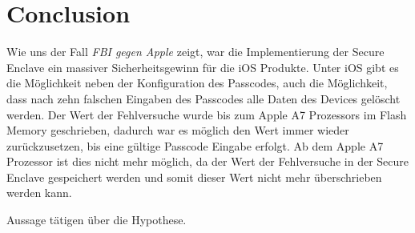 %
%
%
% 


\chapter{Conclusion}
\label{ch:Conclusion}

Wie uns der Fall \textit{\glqq FBI gegen Apple\grqq{}} zeigt, war die Implementierung der Secure Enclave ein massiver Sicherheitsgewinn für die iOS Produkte. Unter iOS gibt es die Möglichkeit neben der Konfiguration des Passcodes, auch die Möglichkeit, dass nach zehn falschen Eingaben des Passcodes alle Daten des Devices gelöscht werden. Der Wert der Fehlversuche wurde bis zum Apple A7 Prozessors im Flash Memory geschrieben, dadurch war es möglich den Wert immer wieder zurückzusetzen, bis eine gültige Passcode Eingabe erfolgt. Ab dem Apple A7 Prozessor ist dies nicht mehr möglich, da der Wert der Fehlversuche in der Secure Enclave gespeichert werden und somit dieser Wert nicht mehr überschrieben werden kann. 

Aussage tätigen über die Hypothese.

